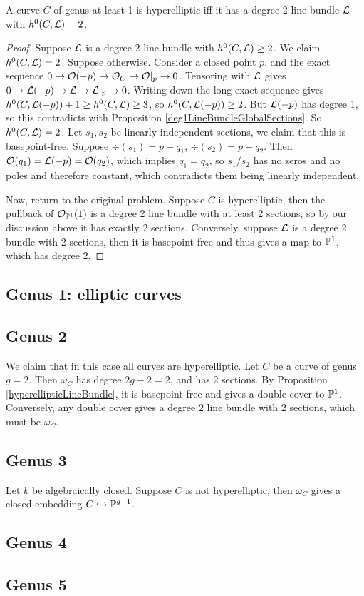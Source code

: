 \documentclass[11pt]{amsart}
\begin{document}
\begin{prop}
\label{hyperellipticLineBundle}
A curve $C$ of genus at least 1 is hyperelliptic iff it has a degree 2 line bundle $\mathcal{L}$ with $h^0(C, \mathcal{L}) = 2$.
\end{prop}

\begin{proof}
Suppose $\mathcal{L}$ is a degree 2 line bundle with $h^0(C,\mathcal{L})\ge 2$. We claim $h^0(C, \mathcal{L}) = 2$. Suppose otherwise. Consider a closed point $p$, and the exact sequence $0\to \mathcal{O}(-p) \to \mathcal{O}_C\to \mathcal{O}|_p \to 0$. Tensoring with $\mathcal{L}$ gives $0\to \mathcal{L}(-p) \to \mathcal{L} \to \mathcal{L}|_p \to 0$. Writing down the long exact sequence gives $h^0(C, \mathcal{L}(-p)) + 1 \ge h^0(C, \mathcal{L}) \ge 3$, so $h^0(C, \mathcal{L}(-p)) \ge 2$. But $\mathcal{L}(-p)$ has degree 1, so this contradicts with Proposition \ref{deg1LineBundleGlobalSections}.  So $h^0(C,\mathcal{L}) = 2$. Let $s_1,s_2$ be linearly independent sections, we claim that this is basepoint-free. Suppose $\div(s_1) = p + q_1$, $\div(s_2) = p+q_2$. Then $\mathcal{O}(q_1) = \mathcal{L}(-p) = \mathcal{O}(q_2)$, which implies $q_1 = q_2$, so $s_1/s_2$ has no zeros and no poles and therefore constant, which contradicts them being linearly independent.

Now, return to the original problem. Suppose $C$ is hyperelliptic, then the pullback of $\mathcal{O}_{\mathbb{P}^1}(1)$ is a degree 2 line bundle with at least 2 sections, so by our discussion above it has exactly 2 sections. Conversely, suppose $\mathcal{L}$ is a degree 2 bundle with 2 sections, then it is basepoint-free and thus gives a map to $\mathbb{P}^1$, which has degree 2.
\end{proof}


\subsection{Genus 1: elliptic curves}

\subsection{Genus 2}

We claim that in this case all curves are hyperelliptic. Let $C$ be a curve of genus $g = 2$. Then $\omega_C$ has degree $2g-2 = 2$, and has 2 sections. By Proposition \ref{hyperellipticLineBundle}, it is basepoint-free and gives a double cover to $\mathbb{P}^1$. Conversely, any double cover gives a degree 2 line bundle with 2 sections, which must be $\omega_C$.

\subsection{Genus 3}

\begin{prop}
Let $k$ be algebraically closed. Suppose $C$ is not hyperelliptic, then $\omega_C$ gives a closed embedding $C\hookrightarrow \mathbb{P}^{g-1}$. 
\end{prop} 

\subsection{Genus 4}

\subsection{Genus 5}
\end{document}
